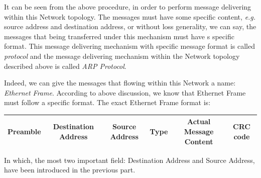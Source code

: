\documentclass[10pt,a4paper]{article}
\begin{document}
It can be seen from the above procedure, in order to perform message delivering within this Network topology. The messages must have some specific content, \textsl{e.g.} source address and destination address, or without loss generality, we can say, the messages that being transferred under this mechanism must have s specific format. This message delivering mechanism with specific message format is called \textit{protocol} and the message delivering mechanism within the Network topology described above is called \textit{ARP Protocol}. 

Indeed, we can give the messages that flowing within this Network a name: \textit{Ethernet Frame}. According to above discussion, we know that Ethernet Frame must follow a specific format. The exact Ethernet Frame format is:
\begin{center}
	\begin{tabular}{|c|c|c|c|c|c|}
		\hline
		Preamble & Destination Address & Source Address & Type & Actual Message Content & CRC code \\
		\hline
	\end{tabular}
\end{center}
In which, the most two important field: Destination Address and Source Address, have been introduced in the previous part.
\end{document}
